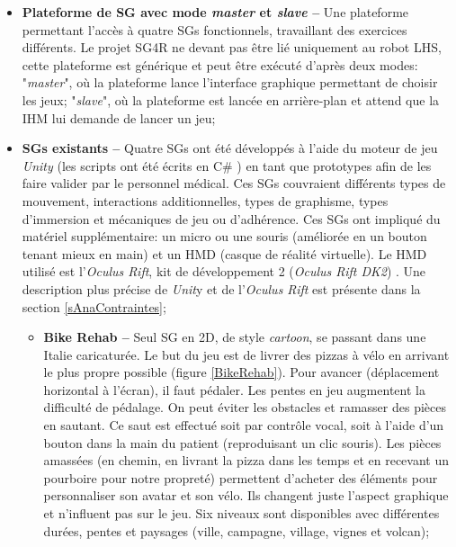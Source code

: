 \begin{itemize}
		\item \textbf{Plateforme de SG avec mode \textit{master} et \textit{slave} --} Une plateforme permettant l'accès à quatre SGs fonctionnels, travaillant des exercices différents. Le projet SG4R ne devant pas être lié uniquement au robot LHS, cette plateforme est générique et peut être exécuté d'après deux modes: "\textit{master}", où la plateforme lance l'interface graphique permettant de choisir les jeux; "\textit{slave}", où la plateforme est lancée en arrière-plan et attend que la IHM lui demande de lancer un jeu;
		
		\item \textbf{SGs existants --} Quatre SGs ont été développés à l'aide du moteur de jeu \textit{Unity} \cite{Unity_website} (les scripts ont été écrits en C\# \cite{CSharp_website}) en tant que prototypes afin de les faire valider par le personnel médical. Ces SGs couvraient différents types de mouvement, interactions additionnelles, types de graphisme, types d'immersion et mécaniques de jeu ou d'adhérence. Ces SGs ont impliqué du matériel supplémentaire: un micro ou une souris (améliorée en un bouton tenant mieux en main) et un HMD (casque de réalité virtuelle). Le HMD utilisé est l'\textit{Oculus Rift}, kit de développement 2 (\textit{Oculus Rift DK2}) \cite{OculusDk2_website}.
		Une description plus précise de \textit{Unit}y et de l'\textit{Oculus Rift} est présente dans la section \ref{sAnaContraintes};
		\begin{itemize} 
			\item \textbf{Bike Rehab --} Seul SG en 2D, de style \textit{cartoon}, se passant dans une Italie caricaturée. Le but du jeu est de livrer des pizzas  à vélo en arrivant le plus propre possible (figure \ref{BikeRehab}). Pour avancer (déplacement horizontal à l'écran), il faut pédaler. Les pentes en jeu augmentent la difficulté de pédalage. On peut éviter les obstacles et ramasser des pièces en sautant. Ce saut est effectué soit par contrôle vocal, soit à l'aide d'un bouton dans la main du patient (reproduisant un clic souris). Les pièces amassées (en chemin, en livrant la pizza dans les temps et en recevant un pourboire pour notre propreté) permettent d'acheter des éléments pour personnaliser son avatar et son vélo. Ils changent juste l'aspect graphique et n'influent pas sur le jeu. Six niveaux sont disponibles avec différentes durées, pentes et paysages (ville, campagne, village, vignes et volcan);\medskip
			

\end{itemize}
\end{itemize}
